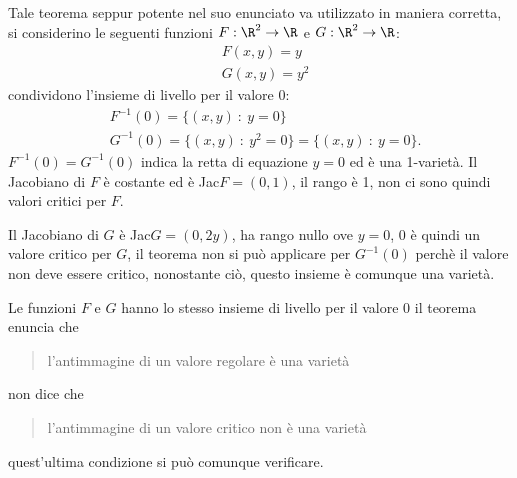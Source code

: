 \documentclass[10pt, letterpaper]{report}
\begin{document}
Tale teorema seppur potente nel suo enunciato va utilizzato in maniera corretta, si considerino le seguenti funzioni $F:\R^2\rightarrow\R$ e $G:\R^2\rightarrow\R$:\begin{align}
    & F(x,y)=y\\
    & G(x,y)=y^2
\end{align}
condividono l'insieme di livello per il valore 0:\begin{align}
    &F^{-1}(0)=\{(x,y) \ : \ y=0\}\\ 
    &G^{-1}(0)=\{(x,y) \ : \ y^2=0\}=\{(x,y) \ : \ y=0\}.
\end{align}
$F^{-1}(0)=G^{-1}(0)$ indica la retta di equazione $y=0$ ed è una 1-varietà. Il Jacobiano di $F$ è costante ed è Jac$F=(0,1)$, il rango è 1, non ci sono quindi valori critici per $F$.\bigskip 

Il Jacobiano di $G$ è Jac$G=(0,2y)$, ha rango nullo ove $y=0$, 0 è quindi un valore critico per $G$, il teorema non si può applicare  per $G^{-1}(0)$ perchè il valore non deve essere critico, nonostante ciò, questo insieme è comunque una varietà.\bigskip

Le funzioni $F$ e $G$ hanno lo stesso insieme di livello per il valore 0 il teorema enuncia che\begin{quote}
    l'antimmagine di un valore regolare è una varietà
\end{quote}
non dice che \begin{quote}
    l'antimmagine di un valore critico non è una varietà
\end{quote}
quest'ultima condizione si può comunque verificare.
\end{document}
